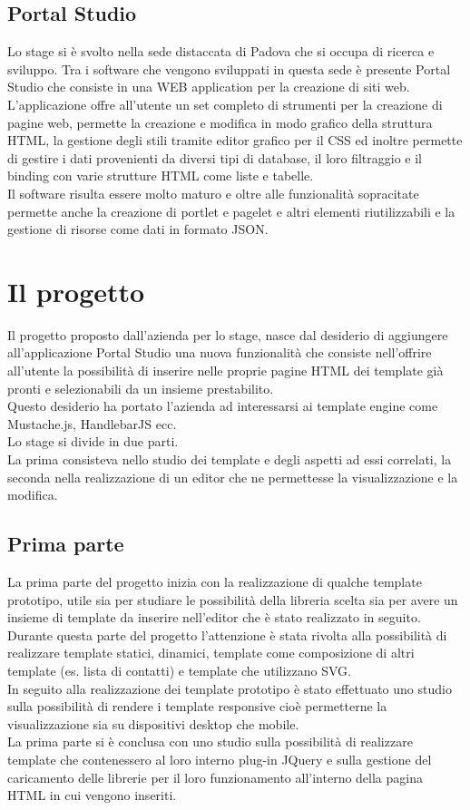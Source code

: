 \subsection{Portal Studio}
Lo stage si è svolto nella sede distaccata di Padova che si occupa di ricerca e sviluppo.
Tra i software che vengono sviluppati in questa sede è presente Portal Studio che consiste in una WEB application per la creazione di siti web.\\
L'applicazione offre all'utente un set completo di strumenti per la creazione di pagine web, permette la creazione e modifica in modo grafico della struttura HTML, la gestione degli stili tramite editor grafico per il CSS ed inoltre permette di gestire i dati provenienti da diversi tipi di database, il loro filtraggio e il binding con varie strutture HTML come liste e tabelle.\\
Il software risulta essere molto maturo e oltre alle funzionalità sopracitate permette anche la creazione di portlet e pagelet e altri elementi riutilizzabili e la gestione di risorse come dati in formato JSON.


\section{Il progetto}
Il progetto proposto dall'azienda per lo stage, nasce dal desiderio di aggiungere all'applicazione Portal Studio una nuova funzionalità che consiste nell'offrire all'utente la possibilità di inserire nelle proprie pagine HTML dei template già pronti e selezionabili da un insieme prestabilito.\\
Questo desiderio ha portato l'azienda ad interessarsi ai template engine come Mustache.js, HandlebarJS ecc.\\
Lo stage si divide in due parti.\\
La prima consisteva nello studio dei template e degli aspetti ad essi correlati, la seconda nella realizzazione di un editor che ne permettesse la visualizzazione e la modifica.
\subsection{Prima parte}
La prima parte del progetto inizia con la realizzazione di qualche template prototipo, utile sia per studiare le possibilità della libreria scelta sia per avere un insieme di template da inserire nell'editor che è stato realizzato in seguito.\\
Durante questa parte del progetto l'attenzione è stata rivolta alla possibilità di realizzare template statici, dinamici, template come composizione di altri template (es. lista di contatti) e template che utilizzano SVG.\\
In seguito alla realizzazione dei template prototipo è stato effettuato uno studio sulla possibilità di rendere i template responsive cioè permetterne la visualizzazione sia su dispositivi desktop che mobile.\\
La prima parte si è conclusa con uno studio sulla possibilità di realizzare template che contenessero al loro interno plug-in JQuery e sulla gestione del caricamento delle librerie per il loro funzionamento all'interno della pagina HTML in cui vengono inseriti.
